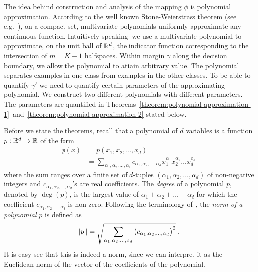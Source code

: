 The idea behind construction and analysis of the mapping $\phi$ is polynomial
approximation. According to the well known Stone-Weierstrass theorem (see
e.g.~\citet[Section~10.10]{Davidson-Donsig-2010}), on a compact set,
multivariate polynomials uniformly approximate any continuous function.
Intuitively speaking, we use a multivariate polynomial to approximate, on the
unit ball of $\mathbb{R}^d$, the indicator function corresponding to the intersection of
$m=K-1$ halfspaces. Within margin $\gamma$ along the decision boundary, we allow
the polynomial to attain arbitrary value. The polynomial separates examples in
one class from examples in the other classes. To be able to quantify $\gamma'$
we need to quantify certain parameters of the approximating polynomial. We
construct two different polynomials with different parameters. The parameters
are quantified in
Theorems~\ref{theorem:polynomial-approximation-1}~and~\ref{theorem:polynomial-approximation-2}
stated below.

Before we state the theorems, recall that a polynomial of $d$ variables is a
function $p:\mathbb{R}^d \to \mathbb{R}$ of the form
\begin{align*}
p(x)
& = p(x_1, x_2, \dots, x_d) \\
& = \sum_{\alpha_1, \alpha_2, \dots, \alpha_d} c_{\alpha_1, \alpha_2, \dots, \alpha_d} x_1^{\alpha_1} x_2^{\alpha_2} \dots x_d^{\alpha_d}
\end{align*}
where the sum ranges over a finite set of $d$-tuples $(\alpha_1, \alpha_2,
\dots, \alpha_d)$ of non-negative integers and $c_{\alpha_1, \alpha_2, \dots,
\alpha_d}$'s are real coefficients. The \emph{degree} of a polynomial $p$, denoted
by $\deg(p)$, is the largest value of $\alpha_1 + \alpha_2 + \dots + \alpha_d$
for which the coefficient $c_{\alpha_1, \alpha_2, \dots, \alpha_d}$ is non-zero.
Following the terminology of~\cite{Klivans-Servedio-2008},
the \emph{norm of a polynomial} $p$ is defined as
$$
\norm{p} = \sqrt{\sum_{\alpha_1, \alpha_2, \dots, \alpha_d} \left(c_{\alpha_1, \alpha_2, \dots, \alpha_d} \right)^2 } \; .
$$
It is easy see that this is indeed a norm, since we can interpret it as the
Euclidean norm of the vector of the coefficients of the polynomial.

